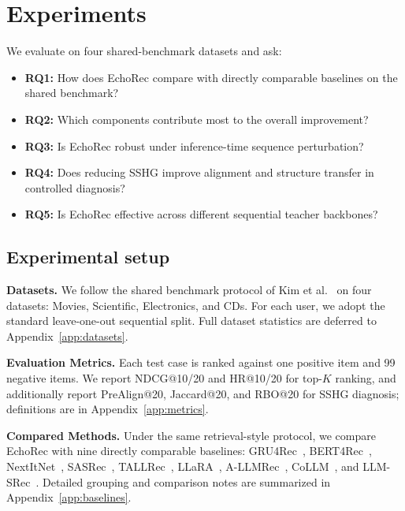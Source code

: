 ﻿\documentclass{article}
\begin{document}
\section{Experiments}
\label{sec:experiment}

We evaluate on four shared-benchmark datasets and ask:
\begin{itemize}[leftmargin=1.5em,itemsep=0pt,topsep=2pt]
\item \textbf{RQ1:} How does EchoRec compare with directly comparable baselines on the shared benchmark?
\item \textbf{RQ2:} Which components contribute most to the overall improvement?
\item \textbf{RQ3:} Is EchoRec robust under inference-time sequence perturbation?
\item \textbf{RQ4:} Does reducing SSHG improve alignment and structure transfer in controlled diagnosis?
\item \textbf{RQ5:} Is EchoRec effective across different sequential teacher backbones?
\end{itemize}

\subsection{Experimental setup}

\noindent\textbf{Datasets.} We follow the shared benchmark protocol of Kim et al.~\cite{kim2025lost} on four datasets: Movies, Scientific, Electronics, and CDs. For each user, we adopt the standard leave-one-out sequential split. Full dataset statistics are deferred to Appendix~\ref{app:datasets}.

\noindent\textbf{Evaluation Metrics.} Each test case is ranked against one positive item and 99 negative items. We report NDCG@10/20 and HR@10/20 for top-\(K\) ranking, and additionally report PreAlign@20, Jaccard@20, and RBO@20 for SSHG diagnosis; definitions are in Appendix~\ref{app:metrics}.

\noindent\textbf{Compared Methods.} Under the same retrieval-style protocol, we compare EchoRec with nine directly comparable baselines: GRU4Rec~\cite{hidasi2016gru4rec}, BERT4Rec~\cite{sun2019bert4rec}, NextItNet~\cite{yuan2019nextitnet}, SASRec~\cite{kang2018sasrec}, TALLRec~\cite{bao2023tallrec}, LLaRA~\cite{liao2024llara}, A-LLMRec~\cite{kim2024allmrec}, CoLLM~\cite{zhang2025collm}, and LLM-SRec~\cite{kim2025lost}. Detailed grouping and comparison notes are summarized in Appendix~\ref{app:baselines}.
\end{document}

